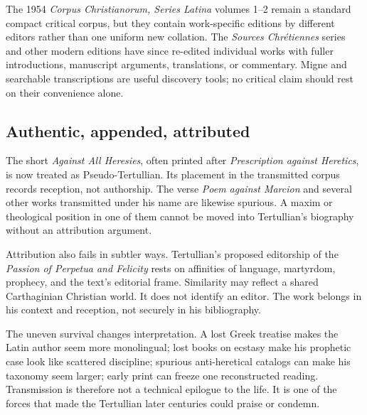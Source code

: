 The 1954 \emph{Corpus Christianorum, Series Latina} volumes 1--2 remain a
standard compact critical corpus, but they contain work-specific editions by
different editors rather than one uniform new collation. The \emph{Sources
Chr\'etiennes} series and other modern editions have since re-edited individual
works with fuller introductions, manuscript arguments, translations, or
commentary. Migne and searchable transcriptions are useful discovery tools; no
critical claim should rest on their convenience alone.

\subsection{Authentic, appended, attributed}

The short \emph{Against All Heresies}, often printed after \emph{Prescription
against Heretics}, is now treated as Pseudo-Tertullian. Its placement in the
transmitted corpus records reception, not authorship. The verse \emph{Poem
against Marcion} and several other works transmitted under his name are likewise
spurious. A maxim or theological position in one of them cannot be moved into
Tertullian's biography without an attribution argument.

Attribution also fails in subtler ways. Tertullian's proposed editorship of the
\emph{Passion of Perpetua and Felicity} rests on affinities of language,
martyrdom, prophecy, and the text's editorial frame. Similarity may reflect a
shared Carthaginian Christian world. It does not identify an editor. The work
belongs in his context and reception, not securely in his bibliography.

The uneven survival changes interpretation. A lost Greek treatise makes the
Latin author seem more monolingual; lost books on ecstasy make his prophetic
case look like scattered discipline; spurious anti-heretical catalogs can make
his taxonomy seem larger; early print can freeze one reconstructed reading.
Transmission is therefore not a technical epilogue to the life. It is one of
the forces that made the Tertullian later centuries could praise or condemn.
